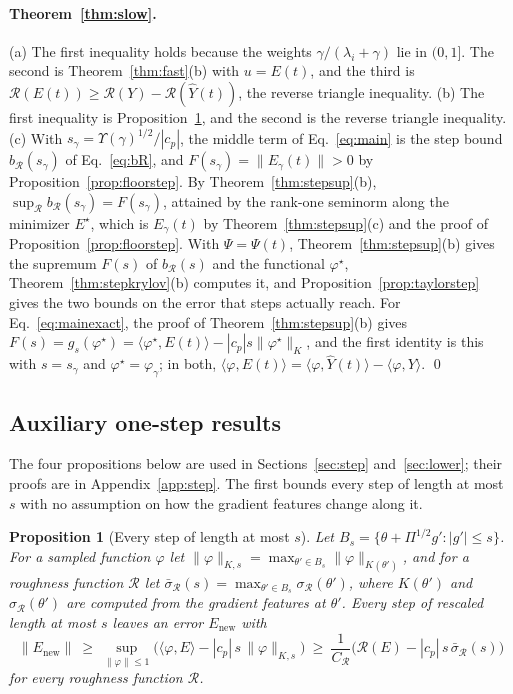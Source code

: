 \documentclass[11pt]{article}
\newtheorem{proposition}{Proposition}
\theoremstyle{definition}
\theoremstyle{remark}
\newcommand{\Rgh}{\mathcal{R}}           %
\newcommand{\sR}{\sigma_{\Rgh}}
\newcommand{\CR}{C_{\Rgh}}
\newcommand{\ip}[2]{\langle #1,#2\rangle}
\begin{document}
\paragraph{Theorem~\ref{thm:slow}.}
(a) The first inequality holds because the weights $\gamma/(\lambda_i+\gamma)$ lie in $(0,1]$.
The second is Theorem~\ref{thm:fast}(b) with $u = E(t)$, and the third is $\Rgh(E(t)) \ge \Rgh(Y) - \Rgh(\hat Y(t))$, the reverse triangle inequality.
(b) The first inequality is Proposition~\ref{prop:stepexact}, and the second is the reverse triangle inequality.
(c) With $s_\gamma = \Upsilon(\gamma)^{1/2}/|c_p|$, the middle term of Eq.~\eqref{eq:main} is the step bound $b_\Rgh(s_\gamma)$ of Eq.~\eqref{eq:bR}, and $F(s_\gamma) = \|E_\gamma(t)\| > 0$ by Proposition~\ref{prop:floorstep}.
By Theorem~\ref{thm:stepsup}(b), $\sup_\Rgh b_\Rgh(s_\gamma) = F(s_\gamma)$, attained by the rank-one seminorm along the minimizer $E^\star$, which is $E_\gamma(t)$ by Theorem~\ref{thm:stepsup}(c) and the proof of Proposition~\ref{prop:floorstep}.
With $\Psi = \Psi(t)$, Theorem~\ref{thm:stepsup}(b) gives the supremum $F(s)$ of $b_\Rgh(s)$ and the functional $\varphi^\star$, Theorem~\ref{thm:stepkrylov}(b) computes it, and Proposition~\ref{prop:taylorstep} gives the two bounds on the error that steps actually reach.
For Eq.~\eqref{eq:mainexact}, the proof of Theorem~\ref{thm:stepsup}(b) gives $F(s) = g_s(\varphi^\star) = \ip{\varphi^\star}{E(t)} - |c_p|s\|\varphi^\star\|_K$, and the first identity is this with $s = s_\gamma$ and $\varphi^\star = \varphi_\gamma$; in both, $\ip{\varphi}{E(t)} = \ip{\varphi}{\hat Y(t)} - \ip{\varphi}{Y}$. \qed

\subsection{Auxiliary one-step results}\label{app:aux}

The four propositions below are used in Sections~\ref{sec:step} and~\ref{sec:lower}; their proofs are in Appendix~\ref{app:step}.
The first bounds every step of length at most $s$ with no assumption on how the gradient features change along it.

\begin{proposition}[Every step of length at most $s$]\label{prop:stepexact}
Let $B_s = \{\theta + \Pi^{1/2}g' : |g'| \le s\}$.
For a sampled function $\varphi$ let $\|\varphi\|_{K,s} = \max_{\theta'\in B_s}\|\varphi\|_{K(\theta')}$, and for a roughness function $\Rgh$ let $\bar\sigma_\Rgh(s) = \max_{\theta'\in B_s}\sR(\theta')$, where $K(\theta')$ and $\sR(\theta')$ are computed from the gradient features at $\theta'$.
Every step of rescaled length at most $s$ leaves an error $E_{\mathrm{new}}$ with
\begin{equation}\label{eq:stepexact}
\|E_{\mathrm{new}}\| \ \ge\ \sup_{\|\varphi\|\le1}\Big(\ip{\varphi}{E} - |c_p|\,s\,\|\varphi\|_{K,s}\Big) \ \ge\ \frac{1}{\CR}\Big(\Rgh(E) - |c_p|\,s\,\bar\sigma_\Rgh(s)\Big)
\end{equation}
for every roughness function $\Rgh$.
\end{proposition}
\end{document}
